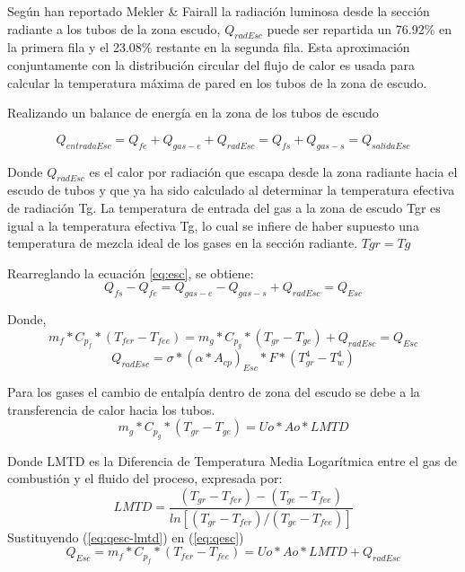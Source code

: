 \par Según  han reportado  Mekler \& Fairall\cite{bib:mekler}  la radiación luminosa desde la sección radiante a los tubos de la zona escudo, $Q_{radEsc}$ puede ser repartida un 76.92\% en la primera fila y el 23.08\% restante en la segunda fila. Esta aproximación conjuntamente con la distribución circular del flujo de calor es usada para calcular la temperatura máxima de pared en los tubos de la zona de escudo.

\par Realizando un balance de energía en la zona de los tubos de escudo

\begin{equation}
\label{eq:esc}
Q_{entradaEsc} = Q_{fe} + Q_{gas-e} + Q_{radEsc} = 
Q_{fs} + Q_{gas-s} = Q_{salidaEsc}
\end{equation}

\par Donde $Q_{radEsc}$ es el calor por radiación que escapa desde la zona radiante hacia el escudo de tubos y que ya ha sido calculado al determinar la temperatura efectiva de radiación Tg. La temperatura de entrada del gas a la zona de escudo Tgr es igual a la temperatura efectiva Tg, lo cual se infiere de haber supuesto una temperatura de mezcla ideal de los gases en la sección radiante. $Tgr = Tg$

\par Rearreglando la ecuación \ref{eq:esc}, se obtiene:
\begin{equation*}
Q_{fs} - Q_{fe} = Q_{gas-e} - Q_{gas-s} + Q_{radEsc} = Q_{Esc}
\end{equation*}
\par Donde,
\begin{equation}
\label{eq:qesc}
m_{f} *C_{p_f} *(T_{fer} - T_{fee}) = 
m_{g} *C_{p_g} *(T_{gr}  - T_{ge}) + Q_{radEsc} = Q_{Esc}
\end{equation}
\begin{equation}
Q_{radEsc} = \sigma *(\alpha *A_{cp} )_{Esc} *F *(T_{gr}^4 -T_w^4)
\end{equation}

\par Para los gases el cambio de entalpía dentro de zona del escudo se debe a la transferencia de calor hacia los tubos.
\begin{equation}
\label{eq:qesc-lmtd}
m_{g} *C_{p_g} *(T_{gr} -T_{ge}) = Uo *Ao *LMTD
\end{equation}

\par Donde LMTD es la Diferencia de Temperatura Media Logarítmica entre el gas de combustión y el fluido del proceso, expresada por:
\begin{equation}
\label{eq:lmtd}
   LMTD = \frac{(T_{gr}-T_{fer}) - (T_{ge}-T_{fee})}
   {ln[(T_{gr}-T_{fer}) /(T_{ge}-T_{fee})]}
\end{equation}
Sustituyendo (\ref{eq:qesc-lmtd}) en (\ref{eq:qesc})
\begin{equation}
\label{eq:tesc}
  Q_{Esc} = m_{f} *C_{p_f} *(T_{fer} - T_{fee}) = Uo *Ao *LMTD + Q_{radEsc}
\end{equation}

